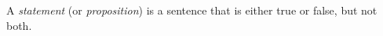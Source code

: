 \guard

\begin{defn}
\label{defn:statement}
  A \emph{statement} (or \emph{proposition}) is a sentence that is either true or false, but not both.
\end{defn}
